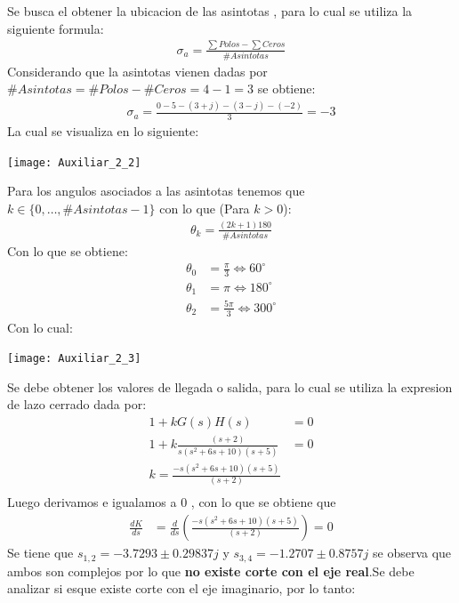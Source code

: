 \documentclass[
  11pt,
  letterpaper,
   addpoints,
   answers
  ]{exam}
\begin{document}
\begin{questions}
\begin{solution}
Se busca el obtener la ubicacion de las asintotas , para lo cual se utiliza la siguiente formula:
\begin{align}
    \sigma_{a}= \frac{\sum Polos - \sum Ceros}{\# Asintotas} 
\end{align}
Considerando que la asintotas vienen dadas por $\#Asintotas = \#Polos - \#Ceros = 4 - 1 = 3$ se obtiene:
\begin{align}
    \sigma_{a}= \frac{ 0 - 5 -(3 + j) - (3 - j) - (-2)}{3} = -3 
\end{align}
La cual se visualiza en lo siguiente:
\begin{center}
    \texttt{[image: Auxiliar\_2\_2]}
  \end{center}
Para los angulos asociados a las asintotas tenemos que $k \in \{0,\dots, \#Asintotas -1\}$ con lo que (Para $k>0$):
\begin{align}
    \theta_{k} = \frac{(2k+1)180}{\#Asintotas}
\end{align}
Con lo que se obtiene:
\begin{align}
    \theta_{0} &=  \frac{\pi}{3} \Leftrightarrow 60^{\circ} \\
    \theta_{1} &=  \pi \Leftrightarrow 180^{\circ} \\
    \theta_{2} &=  \frac{5\pi}{3} \Leftrightarrow 300^{\circ} 
\end{align}
Con lo cual:
\begin{center}
    \texttt{[image: Auxiliar\_2\_3]}
  \end{center}
Se debe obtener los valores de llegada o salida, para lo cual se utiliza la expresion de lazo cerrado dada por:
\begin{align}
    1+kG(s)H(s) &= 0\\
    1+ k\frac{(s+2)}{s(s^{2}+6s+10)(s+5)} &= 0\\
    k = \frac{-s(s^{2}+6s+10)(s+5)}{(s+2)}\\
\end{align}
Luego derivamos e igualamos a 0 , con lo que se obtiene que 
\begin{align}
    \frac{dK}{ds} &= \frac{d}{ds} \left( \frac{-s(s^{2}+6s+10)(s+5)}{(s+2)} \right) = 0
\end{align}
Se tiene que $s_{1,2}= -3.7293 \pm 0.29837j$ y $s_{3,4}=-1.2707 \pm 0.8757j$ se observa que ambos son complejos por lo que \textbf{no existe corte con el eje real}.Se debe analizar si esque existe corte con el eje imaginario, por lo tanto:

\end{solution}
\end{questions}
\end{document}
